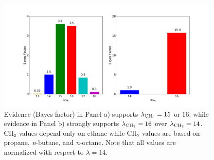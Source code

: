 \documentclass[preprint,letterpaper,floatfix,citeautoscript,aip,jcp]{revtex4-1}
\begin{document}



\begin{figure}[htb!]
	\centering
	\includegraphics[width=4.8in]{Evidence_Mie_CH3_CH2}
	\caption{Evidence (Bayes factor) in Panel a) supports $\lambda_{\rm CH_3} =15 $ or $16$, while evidence in Panel b) strongly supports $\lambda_{\rm CH_2} = 16$ over $\lambda_{\rm CH_2} = 14$. CH$_3$ values depend only on ethane while CH$_2$ values are based on propane, \textit{n}-butane, and \textit{n}-octane. Note that all values are normalized with respect to $\lambda = 14$.}
	\label{fig:Bayes_Factors}
\end{figure}
\end{document}
